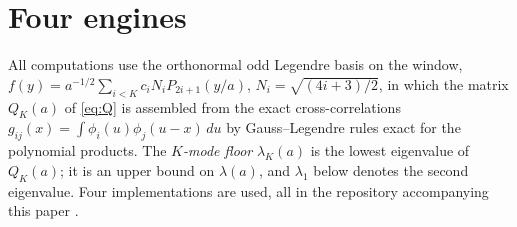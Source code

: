 \documentclass[11pt]{article}
\theoremstyle{definition}
\theoremstyle{remark}
\begin{document}
\section{Four engines}\label{sec:engines}

All computations use the orthonormal odd Legendre basis on the window, $f(y)=a^{-1/2}\sum_{i<K}c_iN_iP_{2i+1}(y/a)$, $N_i=\sqrt{(4i+3)/2}$, in which the matrix $Q_K(a)$ of \eqref{eq:Q} is assembled from the exact cross-correlations $g_{ij}(x)=\int\phi_i(u)\phi_j(u-x)\,du$ by Gauss--Legendre rules exact for the polynomial products. The \emph{$K$-mode floor} $\lambda_K(a)$ is the lowest eigenvalue of $Q_K(a)$; it is an upper bound on $\lambda(a)$, and $\lambda_1$ below denotes the second eigenvalue. Four implementations are used, all in the repository accompanying this paper \cite{michaels-repo}.
\end{document}
